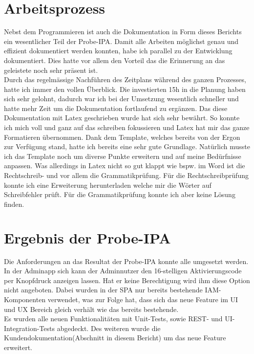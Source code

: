 \section{Arbeitsprozess}
Nebst dem Programmieren ist auch die Dokumentation in Form dieses Berichts ein wesentlicher Teil der Probe-IPA. Damit alle Arbeiten möglichst genau und effizient dokumentiert werden konnten, habe ich parallel zu der Entwicklung dokumentiert. Dies hatte vor allem den Vorteil das die Erinnerung an das geleistete noch sehr präsent ist. \\
Durch das regelmässige Nachführen des Zeitplans während des ganzen Prozesses, hatte ich immer den vollen Überblick. Die investierten 15h in die Planung haben sich sehr gelohnt, dadurch war ich bei der Umsetzung wesentlich schneller und hatte mehr Zeit um die Dokumentation fortlaufend zu ergänzen. Das diese Dokumentation mit Latex geschrieben wurde hat sich sehr bewährt. So konnte ich mich voll und ganz auf das schreiben fokussieren und Latex hat mir das ganze Formatieren übernommen. Dank dem Template, welches bereits von der Ergon zur Verfügung stand, hatte ich bereits eine sehr gute Grundlage. Natürlich musste ich das Template noch um diverse Punkte erweitern und auf meine Bedürfnisse anpassen. Was allerdings in Latex nicht so gut klappt wie bspw. im Word ist die Rechtschreib- und vor allem die Grammatikprüfung. Für die Rechtschreibprüfung konnte ich eine Erweiterung herunterladen welche mir die Wörter auf Schreibfehler prüft. Für die Grammatikprüfung konnte ich aber keine Lösung finden.
\section{Ergebnis der Probe-IPA}
Die Anforderungen an das Resultat der Probe-IPA konnte alle umgesetzt werden. In der Adminapp sich kann der Adminnutzer den 16-stelligen Aktivierungscode per Knopfdruck anzeigen lassen. Hat er keine Berechtigung wird ihm diese Option nicht angeboten. Dabei wurden in der SPA nur bereits bestehende IAM-Komponenten verwendet, was zur Folge hat, dass sich das neue Feature im UI und UX Bereich gleich verhält wie das bereits bestehende.\\
Es wurden alle neuen Funktionalitäten mit Unit-Tests, sowie REST- und UI-Integration-Tests abgedeckt.
Des weiteren wurde die Kundendokumentation(Abschnitt in diesem Bericht) um das neue Feature erweitert.

